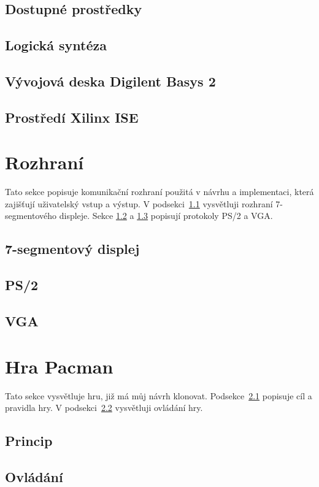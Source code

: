 \documentclass{report}
\begin{document}
\subsection{Dostupné prostředky}\label{sec:dostupneprostredky}
\subsection{Logická syntéza}\label{sec:logickasynteza}
\subsection{Vývojová deska Digilent Basys 2}\label{sec:basys2}
\subsection{Prostředí Xilinx ISE}\label{sec:xilinxise}

\section{Rozhraní}\label{sec:rozhrani}
Tato sekce popisuje komunikační rozhraní použitá v návrhu a implementaci, která zajišťují uživatelský vstup a výstup. V podsekci~\ref{sec:7segment} vysvětluji rozhraní 7-segmentového displeje. Sekce  \ref{sec:ps2} a \ref{sec:vga} popisují protokoly PS/2 a VGA.
\subsection{7-segmentový displej}\label{sec:7segment}
\subsection{PS/2}\label{sec:ps2}
\subsection{VGA}\label{sec:vga}

\section{Hra Pacman}\label{sec:hrapacman}
Tato sekce vysvětluje hru, již má můj návrh klonovat. Podsekce~\ref{sec:principhry} popisuje cíl a pravidla hry. V podsekci~\ref{sec:ovladanihry} vysvětluji ovládání hry.
\subsection{Princip}\label{sec:principhry}
\subsection{Ovládání}\label{sec:ovladanihry}
\end{document}
